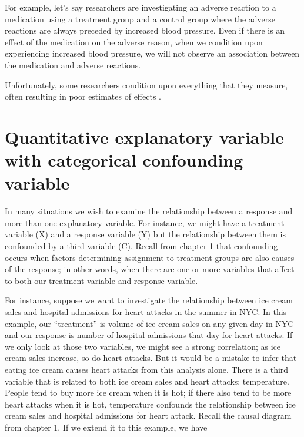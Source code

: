 \documentclass[
]{book}
\begin{document}
For example, let's say researchers are investigating an adverse reaction to a medication using a treatment group and a control group where the adverse reactions are always preceded by increased blood pressure. Even if there is an effect of the medication on the adverse reason, when we condition upon experiencing increased blood pressure, we will not observe an association between the medication and adverse reactions.

Unfortunately, some researchers condition upon everything that they measure, often resulting in poor estimates of effects \citep{hernan2002causal}.

\hypertarget{quantitative-explanatory-variable-with-categorical-confounding-variable}{%
\chapter{Quantitative explanatory variable with categorical confounding variable}\label{quantitative-explanatory-variable-with-categorical-confounding-variable}}

In many situations we wish to examine the relationship between a response and more than one explanatory variable. For instance, we might have a treatment variable (X) and a response variable (Y) but the relationship between them is confounded by a third variable (C). Recall from chapter 1 that confounding occurs when factors determining assignment to treatment groups are also causes of the response; in other words, when there are one or more variables that affect to both our treatment variable and response variable.

For instance, suppose we want to investigate the relationship between ice cream sales and hospital admissions for heart attacks in the summer in NYC. In this example, our ``treatment'' is volume of ice cream sales on any given day in NYC and our response is number of hospital admissions that day for heart attacks. If we only look at those two variables, we might see a strong correlation; as ice cream sales increase, so do heart attacks. But it would be a mistake to infer that eating ice cream causes heart attacks from this analysis alone. There is a third variable that is related to both ice cream sales and heart attacks: temperature. People tend to buy more ice cream when it is hot; if there also tend to be more heart attacks when it is hot, temperature confounds the relationship between ice cream sales and hospital admissions for heart attack. Recall the causal diagram from chapter 1. If we extend it to this example, we have
\end{document}
